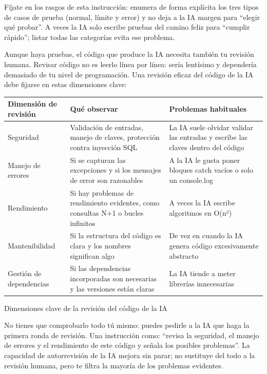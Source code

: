 Fíjate en los rasgos de esta instrucción: enumera de forma explícita los tres tipos de casos de prueba (normal, límite y error) y no deja a la IA margen para “elegir qué probar”. A veces la IA solo escribe pruebas del camino feliz para “cumplir rápido”; listar todas las categorías evita ese problema.


Aunque haya pruebas, el código que produce la IA necesita también tu revisión humana. Revisar código no es leerlo línea por línea: sería lentísimo y dependería demasiado de tu nivel de programación. Una revisión eficaz del código de la IA debe fijarse en estas dimensiones clave:

\begin{center}
\begin{tabularx}{\linewidth}{|X|X|X|}
\hline
\textbf{Dimensión de revisión} & \textbf{Qué observar} & \textbf{Problemas habituales} \tabularnewline
\hline
Seguridad & Validación de entradas, manejo de claves, protección contra inyección SQL & La IA suele olvidar validar las entradas y escribe las claves dentro del código \tabularnewline
Manejo de errores & Si se capturan las excepciones y si los mensajes de error son razonables & A la IA le gusta poner bloques catch vacíos o solo un console.log \tabularnewline
Rendimiento & Si hay problemas de rendimiento evidentes, como consultas N+1 o bucles infinitos & A veces la IA escribe algoritmos en O(n²) \tabularnewline
Mantenibilidad & Si la estructura del código es clara y los nombres significan algo & De vez en cuando la IA genera código excesivamente abstracto \tabularnewline
Gestión de dependencias & Si las dependencias incorporadas son necesarias y las versiones están claras & La IA tiende a meter librerías innecesarias \tabularnewline
\hline
\end{tabularx}
\end{center}

\begin{center}\small\color{gray}Dimensiones clave de la revisión del código de la IA\end{center}

No tienes que comprobarlo todo tú mismo: puedes pedirle a la IA que haga la primera ronda de revisión. Una instrucción como: “revisa la seguridad, el manejo de errores y el rendimiento de este código y señala los posibles problemas”. La capacidad de autorrevisión de la IA mejora sin parar; no sustituye del todo a la revisión humana, pero te filtra la mayoría de los problemas evidentes.

